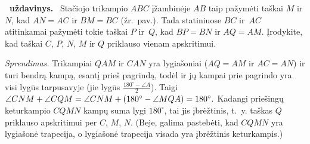 \documentclass[11pt,a4paper]{article}
\newcommand{\hm}[1]{\nobreak\hspace{0pt}#1\nobreak\hspace{0pt}}
\newcounter{uzdavinys}
\newenvironment{uzdavinys}
  {\refstepcounter{uzdavinys}\par\medskip\noindent\textbf{\theuzdavinys\ uždavinys.}\ }
  {\par\medskip}
\begin{document}
\hspace*{-5.2mm}
\begin{minipage}%
{0.78\textwidth}
\begin{uzdavinys}
Stačiojo trikampio $ABC$ įžambinėje $AB$ taip pažymėti taškai $M$ ir $N$, kad $AN=AC$ ir $BM=BC$ (žr.~pav.). Tada statiniuose $BC$ ir~$AC$ atitinkamai pažymėti tokie taškai $P$ ir~$Q$, kad $BP=BN$ ir $AQ=AM$. Įrodykite, kad taškai $C$, $P$, $N$, $M$ ir $Q$ priklauso vienam apskritimui.
\end{uzdavinys}
\end{minipage}\quad%
\begin{minipage}%
{0.8\textwidth}
\end{minipage}
\vspace{0cm}


\textit{Sprendimas.}  Trikampiai $QAM$ ir $CAN$ yra lygiašoniai ($AQ=AM$ ir $AC=AN$) ir turi bendrą kampą, esantį prieš pagrindą, todėl ir jų kampai prie pagrindo yra visi lygūs tarpusavyje (jie lygūs $\frac{180^\circ-\angle A}2$). Taigi $\angle CNM+\angle CQM=\angle CNM\hm+(180^\circ-\angle MQA)\hm=180^\circ.$ Kadangi priešingų keturkampio $CQMN$ kampų suma lygi $180^\circ$, tai jis įbrėžtinis, t.~y. taškas $Q$ priklauso apskritimui per $C$, $M$, $N$. (Beje, galima pastebėti, kad $CQMN$ yra lygiašonė trapecija, o lygiašonė trapecija visada yra įbrėžtinis keturkampis.)
\end{document}
